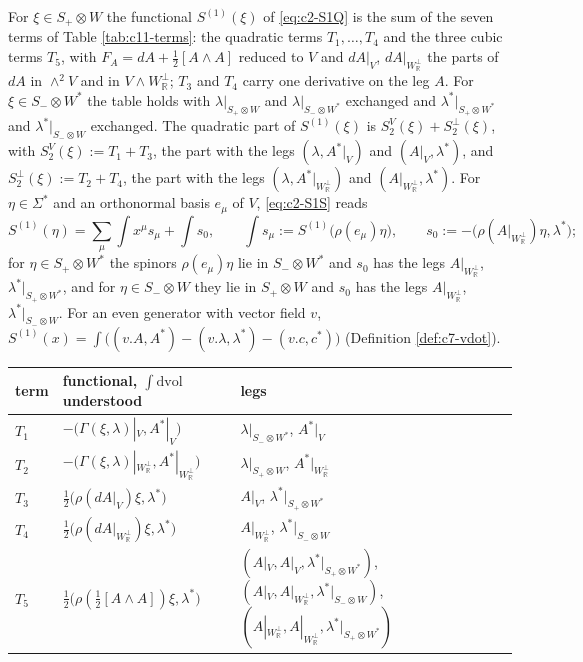 \begin{definition}
\label{def:c11-terms}
For $\xi\in S_+\otimes W$ the functional $S^{(1)}(\xi)$ of \eqref{eq:c2-S1Q} is the sum of the seven terms of Table \ref{tab:c11-terms}: the quadratic terms $T_1,\dots,T_4$ and the three cubic terms $T_5$, with $F_A=dA+\tfrac12[A\wedge A]$ reduced to $V$ and $dA|_V$, $dA|_{W_{\mathbb R}^\perp}$ the parts of $dA$ in $\wedge^2V$ and in $V\wedge W_{\mathbb R}^\perp$; $T_3$ and $T_4$ carry one derivative on the leg $A$. For $\xi\in S_-\otimes W^*$ the table holds with $\lambda|_{S_+\otimes W}$ and $\lambda|_{S_-\otimes W^*}$ exchanged and $\lambda^*|_{S_+\otimes W^*}$ and $\lambda^*|_{S_-\otimes W}$ exchanged. The quadratic part of $S^{(1)}(\xi)$ is $S^V_2(\xi)+S^\perp_2(\xi)$, with $S^V_2(\xi):=T_1+T_3$, the part with the legs $(\lambda,A^*|_V)$ and $(A|_V,\lambda^*)$, and $S^\perp_2(\xi):=T_2+T_4$, the part with the legs $(\lambda,A^*|_{W_{\mathbb R}^\perp})$ and $(A|_{W_{\mathbb R}^\perp},\lambda^*)$. For $\eta\in\Sigma^*$ and an orthonormal basis $e_\mu$ of $V$, \eqref{eq:c2-S1S} reads
\begin{equation}
S^{(1)}(\eta)=\sum_\mu\int x^\mu s_\mu+\int s_0,\qquad \int s_\mu:=S^{(1)}\big(\rho(e_\mu)\eta\big),\qquad s_0:=-\big(\rho(A|_{W_{\mathbb R}^\perp})\eta,\lambda^*\big);
\label{eq:c11-Seta}
\end{equation}
for $\eta\in S_+\otimes W^*$ the spinors $\rho(e_\mu)\eta$ lie in $S_-\otimes W^*$ and $s_0$ has the legs $A|_{W_{\mathbb R}^\perp}$, $\lambda^*|_{S_+\otimes W^*}$, and for $\eta\in S_-\otimes W$ they lie in $S_+\otimes W$ and $s_0$ has the legs $A|_{W_{\mathbb R}^\perp}$, $\lambda^*|_{S_-\otimes W}$. For an even generator with vector field $v$, $S^{(1)}(x)=\int\big((v.A,A^*)-(v.\lambda,\lambda^*)-(v.c,c^*)\big)$ (Definition \ref{def:c7-vdot}).
\end{definition}

\begin{tabular}{l|l|l}
term & functional, $\int\mathrm{dvol}$ understood & legs\\
\hline
$T_1$ & $-\big(\Gamma(\xi,\lambda)|_V,A^*|_V\big)$ & $\lambda|_{S_-\otimes W^*}$, $A^*|_V$\\
$T_2$ & $-\big(\Gamma(\xi,\lambda)|_{W_{\mathbb R}^\perp},A^*|_{W_{\mathbb R}^\perp}\big)$ & $\lambda|_{S_+\otimes W}$, $A^*|_{W_{\mathbb R}^\perp}$\\
$T_3$ & $\tfrac12\big(\rho(dA|_V)\xi,\lambda^*\big)$ & $A|_V$, $\lambda^*|_{S_+\otimes W^*}$\\
$T_4$ & $\tfrac12\big(\rho(dA|_{W_{\mathbb R}^\perp})\xi,\lambda^*\big)$ & $A|_{W_{\mathbb R}^\perp}$, $\lambda^*|_{S_-\otimes W}$\\
$T_5$ & $\tfrac12\big(\rho(\tfrac12[A\wedge A])\xi,\lambda^*\big)$ & $(A|_V,A|_V,\lambda^*|_{S_+\otimes W^*})$, $(A|_V,A|_{W_{\mathbb R}^\perp},\lambda^*|_{S_-\otimes W})$, $(A|_{W_{\mathbb R}^\perp},A|_{W_{\mathbb R}^\perp},\lambda^*|_{S_+\otimes W^*})$\\
\end{tabular}

